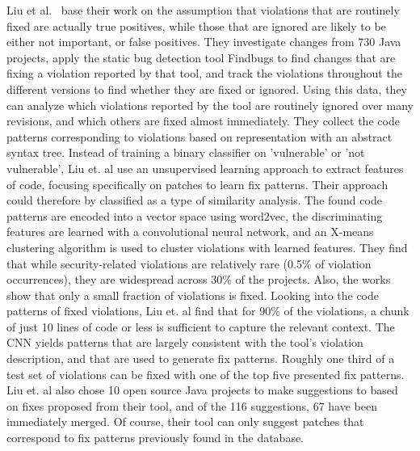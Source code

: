 \documentclass[
a4paper,
pagesize,
pdftex,
12pt,
ngerman,
fleqn,
final,
]{scrartcl}
\begin{document}
	Liu et al.~\cite{Liu.2018} base their work on the assumption that violations that are routinely fixed are actually true positives, while those that are ignored are likely to be either not important, or false positives. They investigate changes from 730 Java projects, apply the static bug detection tool Findbugs to find changes that are fixing a violation reported by that tool, and track the violations throughout the different versions to find whether they are fixed or ignored. Using this data, they can analyze which violations reported by the tool are routinely ignored over many revisions, and which others are fixed almost immediately. They collect the code patterns corresponding to violations based on representation with an abstract syntax tree. Instead of training a binary classifier on 'vulnerable' or 'not vulnerable', Liu et. al use an unsupervised learning approach to extract features of code, focusing specifically on patches to learn fix patterns. Their approach could therefore by classified as a type of similarity analysis. The found code patterns are encoded into a vector space using word2vec, the discriminating features are learned with a convolutional neural network, and an X-means clustering algorithm is used to cluster violations with learned features. They find that while security-related violations are relatively rare (0.5\% of violation occurrences), they are widespread across 30\% of the projects. Also, the works show that only a small fraction of violations is fixed. Looking into the code patterns of fixed violations, Liu et. al find that for 90\% of the violations, a chunk of just 10 lines of code or less is sufficient to capture the relevant context. The CNN yields patterns that are largely consistent with the tool's violation description, and that are used to generate fix patterns. Roughly one third of a test set of violations can be fixed with one of the top five presented fix patterns. Liu et. al also chose 10 open source Java projects to make suggestions to based on fixes proposed from their tool, and of the 116 suggestions, 67 have been immediately merged. Of course, their tool can only suggest patches that correspond to fix patterns previously found in the database. \\
\end{document}

